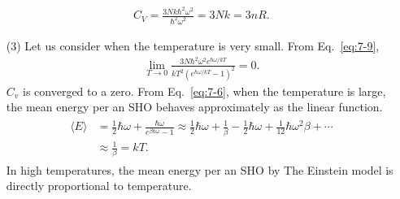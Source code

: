 \documentclass[floatfix,nofootinbib,superscriptaddress,fleqn]{revtex4-2}
\begin{document}
\begin{itemize}
\begin{align}
    C_V = \frac{3Nk\hbar^2\omega^2}
    {\hbar^2\omega^2}=3Nk = 3nR.
  \end{align}
  \item[(3)] Let us consider when the temperature is very small.
  From Eq.~\eqref{eq:7-9},
  \begin{align}
    \lim_{T\rightarrow 0}\frac{3N\hbar^2\omega^2e^{\hbar\omega/kT}}
    {kT^2\left(e^{\hbar\omega/kT}-1\right)^2} = 0.
  \end{align} 
  $C_v$ is converged to a zero.
  From Eq.~\eqref{eq:7-6}, when the temperature is large,
  the mean energy per an SHO behaves approximately as the linear function.
   \begin{align}
    \begin{split}
      \langle E\rangle &=\frac{1}{2}\hbar\omega
      +\frac{\hbar\omega}{e^{\beta\hbar\omega}-1} 
      \approx \frac{1}{2}\hbar\omega
      +\frac{1}{\beta}-\frac{1}{2}\hbar\omega
      +\frac{1}{12}\hbar\omega^2\beta+\cdots  \\
      &\approx \frac{1}{\beta} = kT.
    \end{split}
   \end{align} 
   In high temperatures, the mean energy per an SHO by The Einstein model is
   directly proportional to temperature.
\end{itemize}
\end{document}
